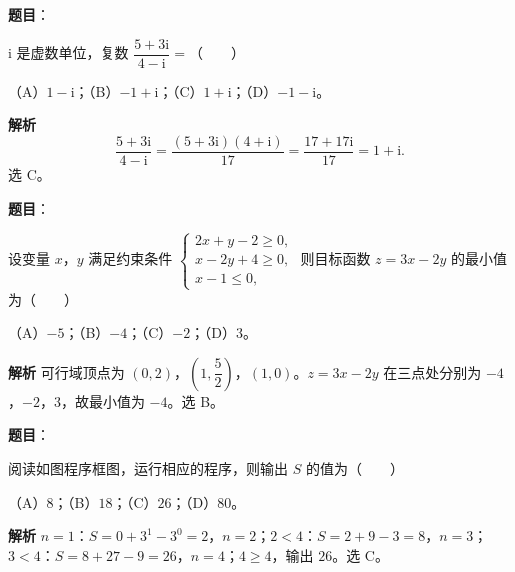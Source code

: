 
\begin{answer}

\textbf{题目}：

$\mathrm i$ 是虚数单位，复数 $\dfrac{5+3\mathrm i}{4-\mathrm i}=$\mbox{（　　）}

（A）$1-\mathrm i$；（B）$-1+\mathrm i$；（C）$1+\mathrm i$；（D）$-1-\mathrm i$。

\textbf{解析}
\nopagebreak[4]
\[\frac{5+3\mathrm i}{4-\mathrm i}=\frac{(5+3\mathrm i)(4+\mathrm i)}{17}=\frac{17+17\mathrm i}{17}=1+\mathrm i.\]
选 C。


\end{answer}
\begin{answer}

\textbf{题目}：

设变量 $x$，$y$ 满足约束条件 $\begin{cases}2x+y-2\geqslant0,\\ x-2y+4\geqslant0,\\ x-1\leqslant0,\end{cases}$ 则目标函数 $z=3x-2y$ 的最小值为\mbox{（　　）}

（A）$-5$；（B）$-4$；（C）$-2$；（D）$3$。

\textbf{解析}
可行域顶点为 $(0,2)$，$\left(1,\dfrac52\right)$，$(1,0)$。$z=3x-2y$ 在三点处分别为 $-4$，$-2$，$3$，故最小值为 $-4$。选 B。


\end{answer}
\begin{answer}

\textbf{题目}：

阅读如图程序框图，运行相应的程序，则输出 $S$ 的值为\mbox{（　　）}
\nopagebreak[4]
\begin{center}\end{center}
\nopagebreak[4]
（A）$8$；（B）$18$；（C）$26$；（D）$80$。

\textbf{解析}
$n=1$：$S=0+3^1-3^0=2$，$n=2$；$2<4$：$S=2+9-3=8$，$n=3$；$3<4$：$S=8+27-9=26$，$n=4$；$4\geqslant4$，输出 $26$。选 C。


\end{answer}
